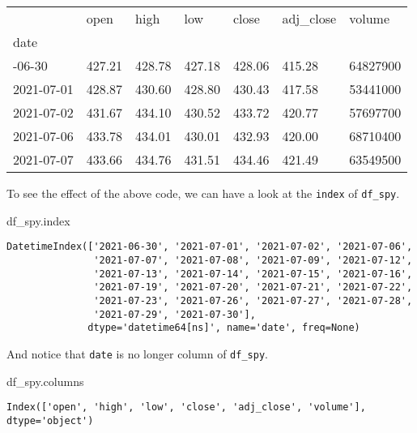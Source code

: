 \documentclass[
  letterpaper,
  DIV=11,
  numbers=noendperiod]{scrreprt}
\newenvironment{Shaded}{\begin{snugshade}}{\end{snugshade}}
\newcommand{\NormalTok}[1]{\textcolor[rgb]{0.00,0.23,0.31}{#1}}
\begin{document}
\begin{longtable}[]{@{}lllllll@{}}
\toprule\noalign{}
& open & high & low & close & adj\_close & volume \\
date & & & & & & \\
\midrule\noalign{}
\endhead
\bottomrule\noalign{}
\endlastfoot
2021-06-30 & 427.21 & 428.78 & 427.18 & 428.06 & 415.28 & 64827900 \\
2021-07-01 & 428.87 & 430.60 & 428.80 & 430.43 & 417.58 & 53441000 \\
2021-07-02 & 431.67 & 434.10 & 430.52 & 433.72 & 420.77 & 57697700 \\
2021-07-06 & 433.78 & 434.01 & 430.01 & 432.93 & 420.00 & 68710400 \\
2021-07-07 & 433.66 & 434.76 & 431.51 & 434.46 & 421.49 & 63549500 \\
\end{longtable}

To see the effect of the above code, we can have a look at the
\texttt{index} of \texttt{df\_spy}.

\begin{Shaded}
\begin{Highlighting}[]
\NormalTok{df\_spy.index}
\end{Highlighting}
\end{Shaded}

\begin{verbatim}
DatetimeIndex(['2021-06-30', '2021-07-01', '2021-07-02', '2021-07-06',
               '2021-07-07', '2021-07-08', '2021-07-09', '2021-07-12',
               '2021-07-13', '2021-07-14', '2021-07-15', '2021-07-16',
               '2021-07-19', '2021-07-20', '2021-07-21', '2021-07-22',
               '2021-07-23', '2021-07-26', '2021-07-27', '2021-07-28',
               '2021-07-29', '2021-07-30'],
              dtype='datetime64[ns]', name='date', freq=None)
\end{verbatim}

And notice that \texttt{date} is no longer column of \texttt{df\_spy}.

\begin{Shaded}
\begin{Highlighting}[]
\NormalTok{df\_spy.columns}
\end{Highlighting}
\end{Shaded}

\begin{verbatim}
Index(['open', 'high', 'low', 'close', 'adj_close', 'volume'], dtype='object')
\end{verbatim}
\end{document}

